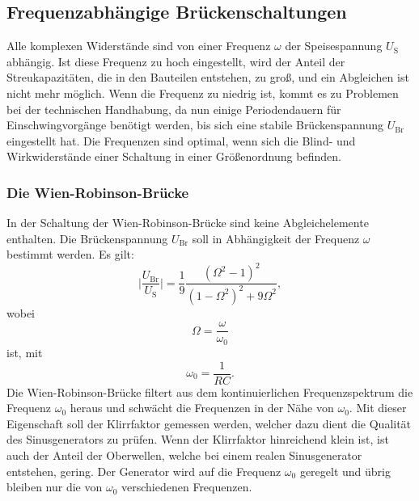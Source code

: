 \subsection{Frequenzabhängige Brückenschaltungen}

    Alle komplexen Widerstände sind von einer Frequenz $\omega$ der Speisespannung $U_\text{S}$ abhängig.
    Ist diese Frequenz zu hoch eingestellt, wird der Anteil der Streukapazitäten, die in den Bauteilen
    entstehen, zu groß, und ein Abgleichen ist nicht mehr möglich.
    Wenn die Frequenz zu niedrig ist, kommt es zu Problemen bei der technischen Handhabung,
    da nun einige Periodendauern für Einschwingvorgänge benötigt werden, bis sich eine stabile Brückenspannung $U_\text{Br}$
    eingestellt hat.
    Die Frequenzen sind optimal, wenn sich die Blind- und Wirkwiderstände einer Schaltung
    in einer Größenordnung befinden.

    \subsubsection{Die Wien-Robinson-Brücke}

        In der Schaltung der Wien-Robinson-Brücke sind keine Abgleichelemente enthalten.
        Die Brückenspannung $U_\text{Br}$ soll in Abhängigkeit der Frequenz $\omega$ bestimmt werden.
        Es gilt:
        \begin{equation}
            \lvert \frac{U_\text{Br}}{U_\text{S}} \rvert = \frac{1}{9} \frac{(\Omega^2 - 1)^2}{(1 - \Omega^2)^2 + 9\Omega^2},
        \end{equation}
        wobei
        \begin{equation}
            \Omega = \frac{\omega}{\omega_0} \label{eqn: GroßOmega}
        \end{equation}
        ist, mit
        \begin{equation}
            \omega_0 = \frac{1}{RC}. \label{eqn: omeganull}
        \end{equation}
        Die Wien-Robinson-Brücke filtert aus dem kontinuierlichen Frequenzspektrum die Frequenz $\omega_0$ heraus
        und schwächt die Frequenzen in der Nähe von $\omega_0$.
        Mit dieser Eigenschaft soll der Klirrfaktor gemessen werden, welcher dazu dient die Qualität des
        Sinusgenerators zu prüfen.
        Wenn der Klirrfaktor hinreichend klein ist, ist auch der Anteil der Oberwellen, welche bei einem
        realen Sinusgenerator entstehen, gering.
        Der Generator wird auf die Frequenz $\omega_0$ geregelt und übrig bleiben nur die von $\omega_0$
        verschiedenen Frequenzen.

